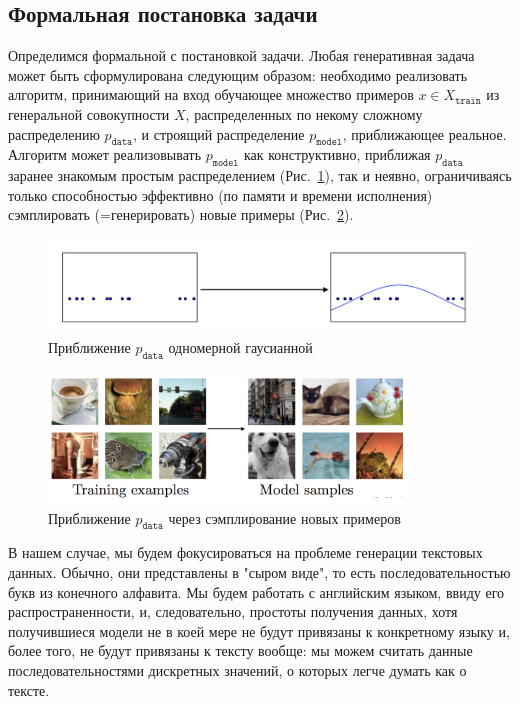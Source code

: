\documentclass{spbau-diploma}
\begin{document}
\subsection{Формальная постановка задачи}
\newcommand{\Xtrain}{X_{\texttt{train}}}
\newcommand{\pdata}{p_{\texttt{data}}}
\newcommand{\pmodel}{p_{\texttt{model}}}
Определимся формальной с постановкой задачи. Любая генеративная задача может 
быть сформулирована следующим образом: необходимо реализовать алгоритм, 
принимающий на вход обучающее множество примеров $x \in 
\Xtrain$ из генеральной 
совокупности $X$, распределенных по некому сложному распределению $\pdata$, и 
строящий распределение $\pmodel$, приближающее реальное. 
Алгоритм может реализовывать $\pmodel$ как 
конструктивно, приближая $\pdata$ заранее знакомым простым распределением 
(Рис.~\ref{density_estimation}), так и неявно, ограничиваясь 
только способностью эффективно (по памяти и времени исполнения) сэмплировать 
(=генерировать) новые примеры (Рис.~\ref{density_samples}).

\begin{figure}[H]
\centering
\includegraphics[width=\textwidth]{images/density_estimation.png}
\caption{Приближение $\pdata$ одномерной гаусианной~\cite{1701.00160}}
\label{density_estimation}
\end{figure}

\begin{figure}[H]
\centering
\includegraphics[width=0.85\textwidth]{images/density_samples.png}
\caption{Приближение $\pdata$ через сэмплирование новых примеров~\cite{1701.00160}}
\label{density_samples}
\end{figure}

В нашем случае, мы будем фокусироваться на проблеме генерации текстовых данных.
Обычно, они представлены в "сыром виде", то есть последовательностью
букв из конечного алфавита. Мы будем работать с английским языком, 
ввиду его распространенности, и, следовательно, простоты получения данных, хотя 
получившиеся модели не в коей мере не будут привязаны к конкретному языку и, 
более того, не будут привязаны к тексту вообще: мы можем считать данные 
последовательностями дискретных значений, о которых легче думать как о тексте.
\end{document}

